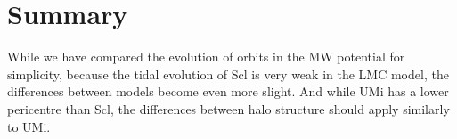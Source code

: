 \section{Summary}\label{summary}

While we have compared the evolution of orbits in the MW potential for
simplicity, because the tidal evolution of Scl is very weak in the LMC
model, the differences between models become even more slight. And while
UMi has a lower pericentre than Scl, the differences between halo
structure should apply similarly to UMi.
